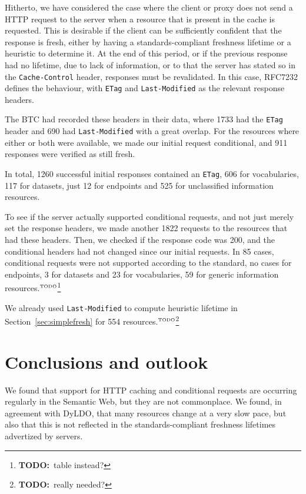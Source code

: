 \documentclass{llncs}
\newcommand{\httph}[1]{\texttt{#1}}
\newcommand{\todo}[1]{\ensuremath{^{\textrm{\tiny{TODO}\normalsize}}}\footnote{\textbf{TODO:}~#1}}
\begin{document}
Hitherto, we have considered the case where the client or proxy does
not send a HTTP request to the server when a resource that is present
in the cache is requested. This is desirable if the client can be
sufficiently confident that the response is fresh, either by having a
standards-compliant freshness lifetime or a heuristic to determine
it. At the end of this period, or if the previous response had no
lifetime, due to lack of information, or to that the server has stated
so in the \httph{Cache-Control} header, responses must be
revalidated. In this case, RFC7232 defines the behaviour, with
\httph{ETag} and \httph{Last-Modified} as the relevant response
headers.

The BTC had recorded these headers in their data, where 1733 had the
\httph{ETag} header and 690 had \httph{Last-Modified} with a great
overlap. For the resources where either or both were available, we
made our initial request conditional, and 911 responses were verified
as still fresh. 

In total, 1260 successful initial responses contained
an \httph{ETag}, 606 for vocabularies, 117 for datasets, just 12 for
endpoints and 525 for unclassified information resources.

To see if the server actually supported conditional requests, and not
just merely set the response headers, we made another 1822 requests to
the resources that had these headers. Then, we checked if the response
code was 200, and the conditional headers had not changed since our
initial requests. In 85 cases, conditional requests were not supported
according to the standard, no cases for endpoints, 3 for datasets and
23 for vocabularies, 59 for generic information resources.\todo{table instead?}


We already used \httph{Last-Modified} to compute heuristic lifetime
in Section~\ref{sec:simplefresh} for 554 resources.\todo{really needed?}

\section{Conclusions and outlook}

We found that support for HTTP caching and conditional requests are
occurring regularly in the Semantic Web, but they are not
commonplace. We found, in agreement with DyLDO\cite{dyldo2}, that many
resources change at a very slow pace, but also that this is not
reflected in the standards-compliant freshness lifetimes advertized by
servers.
\end{document}
